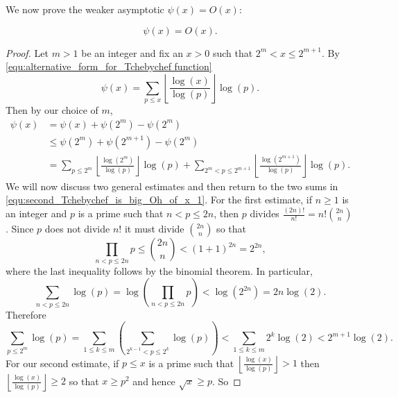       We now prove the weaker asymptotic $\psi(x) = O(x)$:

      \begin{proposition}\label{prop:second_Tchebychef_is_big_Oh_of_x}
        \phantom{ }
        \[
          \psi(x) = O(x).
        \]
      \end{proposition}
      \begin{proof}
        Let $m > 1$ be an integer and fix an $x > 0$ such that $2^{m} < x \le 2^{m+1}$. By \cref{equ:alternative_form_for_Tchebychef function}
        \[
          \psi(x) = \sum_{p \le x}\left\lfloor\frac{\log(x)}{\log(p)}\right\rfloor\log(p).
        \]
        Then by our choice of $m$,
        \begin{equation}\label{equ:second_Tchebychef_is_big_Oh_of_x_1}
          \begin{aligned}
            \psi(x) &= \psi(x)+\psi(2^{m})-\psi(2^{m}) \\
            &\le \psi(2^{m})+\psi(2^{m+1})-\psi(2^{m}) \\
            &= \sum_{p \le 2^{m}}\left\lfloor\frac{\log(2^{m})}{\log(p)}\right\rfloor\log(p)+\sum_{2^{m} < p \le 2^{m+1}}\left\lfloor\frac{\log(2^{m+1})}{\log(p)}\right\rfloor\log(p).
          \end{aligned}
        \end{equation}
        We will now discuss two general estimates and then return to the two sums in \cref{equ:second_Tchebychef_is_big_Oh_of_x_1}. For the first estimate, if $n \ge 1$ is an integer and $p$ is a prime such that $n < p \le 2n$, then $p$ divides $\frac{(2n)!}{n!} = n!\binom{2n}{n}$. Since $p$ does not divide $n!$ it must divide $\binom{2n}{n}$ so that
        \[
          \prod_{n < p \le 2n}p \le \binom{2n}{n} < (1+1)^{2n} = 2^{2n},
        \]
        where the last inequality follows by the binomial theorem. In particular,
        \[
          \sum_{n < p \le 2n}\log(p) = \log\left(\prod_{n < p \le 2n}p\right) < \log(2^{2n}) = 2n\log(2).
        \]
        Therefore
        \begin{equation}\label{equ:second_Tchebychef_is_big_Oh_of_x_2}
          \sum_{p \le 2^{m}}\log(p) = \sum_{1 \le k \le m}\left(\sum_{2^{k-1} < p \le 2^{k}}\log(p)\right) < \sum_{1 \le k \le m}2^{k}\log(2) < 2^{m+1}\log(2).
        \end{equation}
        For our second estimate, if $p \le x$ is a prime such that $\left\lfloor\frac{\log(x)}{\log(p)}\right\rfloor > 1$ then $\left\lfloor\frac{\log(x)}{\log(p)}\right\rfloor \ge 2$ so that $x \ge p^{2}$ and hence $\sqrt{x} \ge p$. So

\end{proof}

